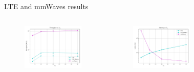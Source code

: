 \documentclass{beamer}
\begin{document}
	\begin{frame}{LTE and mmWaves results}
		\begin{columns}
				\begin{figure}
					\vspace{-0.1in}
					\includegraphics[scale=0.28]{throughput_lambda_bs_lte_mmwave_UDP}
				\end{figure}
				\begin{figure}
					\vspace{-0.2in}
					\includegraphics[scale=0.28]{latency_lambda_bs_lte_mmwave_UDP}
				\end{figure}
				\begin{figure}

\end{figure}
\end{columns}
\end{frame}
\end{document}

